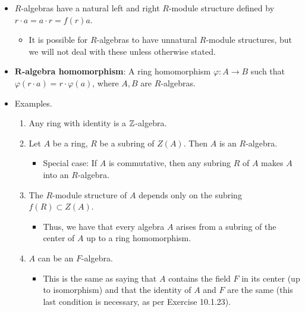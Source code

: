 \documentclass[../notes.tex]{subfiles}
\begin{document}
\begin{itemize}
    \item {}$R$-algebras have a natural left and right $R$-module structure defined by $r\cdot a=a\cdot r=f(r)a$.
    \begin{itemize}
        \item It is possible for $R$-algebras to have unnatural $R$-module structures, but we will not deal with these unless otherwise stated.
    \end{itemize}
    \item \textbf{$\bm{R}$-algebra homomorphism}: A ring homomorphism $\varphi:A\to B$ such that $\varphi(r\cdot a)=r\cdot\varphi(a)$, where $A,B$ are $R$-algebras.
    \item Examples.
    \begin{enumerate}
        \item Any ring with identity is a $\mathbb{Z}$-algebra.
        \item Let $A$ be a ring, $R$ be a subring of $Z(A)$. Then $A$ is an $R$-algebra.
        \begin{itemize}
            \item Special case: If $A$ is commutative, then any subring $R$ of $A$ makes $A$ into an $R$-algebra.
        \end{itemize}
        \item The $R$-module structure of $A$ depends only on the subring $f(R)\subset Z(A)$.
        \begin{itemize}
            \item Thus, we have that every algebra $A$ arises from a subring of the center of $A$ up to a ring homomorphism.
        \end{itemize}
        \item $A$ can be an $F$-algebra.
        \begin{itemize}
            \item This is the same as saying that $A$ contains the field $F$ in its center (up to isomorphism) and that the identity of $A$ and $F$ are the same (this last condition is necessary, as per Exercise 10.1.23).
        \end{itemize}
    \end{enumerate}
\end{itemize}
\end{document}
